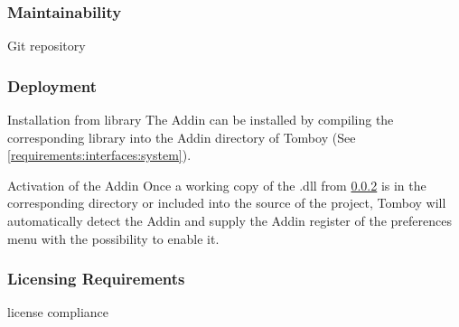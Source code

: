     \subsubsection{Maintainability}
    \label{requirements:maintainability}
    \label{requirements:maintainability:github}
    \begin{requirement}{Git repository}
    \end{requirement}

    \label{requirements:maintainability:codedoc}
    \begin{requirement}
    \end{requirement}

    \subsubsection{Deployment}
    \label{requirements:deployment}
    \begin{requirement}{Installation from library}
      \label{requirements:deployment:installation}
      The Addin can be installed by compiling the corresponding library into the Addin directory of Tomboy (See \ref{requirements:interfaces:system}).
    \end{requirement}

    \begin{requirement}{Activation of the Addin}
      \label{requirements:deployment:activation}
      Once a working copy of the .dll from \ref{requirements:deployment} is in the corresponding directory or included into the source of the project, Tomboy will automatically detect the Addin and supply the Addin register of the preferences menu with the possibility to enable it.
    \end{requirement}

    \subsubsection{Licensing Requirements}
    \label{requirements:license}
    \begin{requirement}{license compliance}
      \label{requirements:license:compliance}
    \end{requirement}


